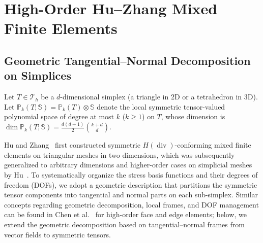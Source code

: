 \section{High-Order Hu--Zhang Mixed Finite Elements}
\label{sec:huzhang_elements}

\subsection{Geometric Tangential--Normal Decomposition on Simplices}
\label{subsec:geometric_decomposition}

Let $T \in \mathcal{T}_h$ be a $d$-dimensional simplex (a triangle in 2D or a tetrahedron in 3D). Let $\mathbb{P}_k(T;\mathbb{S}) = \mathbb{P}_k(T)\otimes\mathbb{S}$ denote the local symmetric tensor-valued polynomial space of degree at most $k$ ($k \ge 1$) on $T$, whose dimension is $\dim \mathbb{P}_k(T;\mathbb{S}) = \frac{d(d+1)}{2}\binom{k+d}{d}$.

Hu and Zhang~\cite{HuZhang2014} first constructed symmetric $H(\operatorname{div})$-conforming mixed finite elements on triangular meshes in two dimensions, which was subsequently generalized to arbitrary dimensions and higher-order cases on simplicial meshes by Hu~\cite{Hu2015}. To systematically organize the stress basis functions and their degrees of freedom (DOFs), we adopt a geometric description that partitions the symmetric tensor components into tangential and normal parts on each sub-simplex. Similar concepts regarding geometric decomposition, local frames, and DOF management can be found in Chen et al.~\cite{Chen2024} for high-order face and edge elements; below, we extend the geometric decomposition based on tangential--normal frames from vector fields to symmetric tensors.

